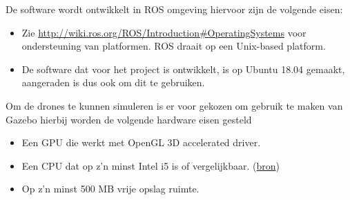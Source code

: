 \documentclass[a4paper, 11pt, oneside]{report}
\begin{document}
De software wordt ontwikkelt in ROS omgeving hiervoor zijn de volgende eisen:
\begin{itemize}
	\item  Zie \href{http://wiki.ros.org/ROS/Introduction\#Operating\_Systems}{http://wiki.ros.org/ROS/Introduction\#Operating\textunderscore Systems} voor ondersteuning van platformen. ROS draait op een Unix-based platform.
	\item De software dat voor het project is ontwikkelt, is op Ubuntu 18.04 gemaakt, aangeraden is dus ook om dit te gebruiken.
\end{itemize}

Om de drones te kunnen simuleren is er voor gekozen om gebruik te maken van Gazebo hierbij worden de volgende hardware eisen gesteld

\begin{itemize}
	\item Een GPU die werkt met OpenGL 3D accelerated driver.
	\item Een CPU dat op z'n minst Intel i5 is of vergelijkbaar. (\href{http://gazebosim.org/tutorials?tut=guided_b1&cat=}{bron})
	\item Op z'n minst 500 MB vrije opslag ruimte.
\end{itemize}
\end{document}
